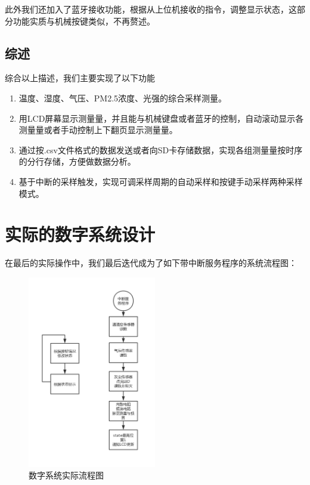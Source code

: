 \documentclass[a4paper, 11pt]{article} %
\begin{document}
此外我们还加入了蓝牙接收功能，根据从上位机接收的指令，调整显示状态，这部分功能实质与机械按键类似，不再赘述。


\subsection{综述}

综合以上描述，我们主要实现了以下功能

\begin{enumerate}
  \item 温度、湿度、气压、PM2.5浓度、光强的综合采样测量。
  \item 用LCD屏幕显示测量量，并且能与机械键盘或者蓝牙的控制，自动滚动显示各测量量或者手动控制上下翻页显示测量量。
  \item 通过按.csv文件格式的数据发送或者向SD卡存储数据，实现各组测量量按时序的分行存储，方便做数据分析。
  \item 基于中断的采样触发，实现可调采样周期的自动采样和按键手动采样两种采样模式。
\end{enumerate}

\section{实际的数字系统设计}
\label{sec:digital_final}
在最后的实际操作中，我们最后迭代成为了如下带中断服务程序的系统流程图：

\begin{figure}[H]
  \centering
  \includegraphics[width = 0.5\textwidth]{digital_flow_real.png}
  \caption{数字系统实际流程图}
\end{figure}
\end{document}
